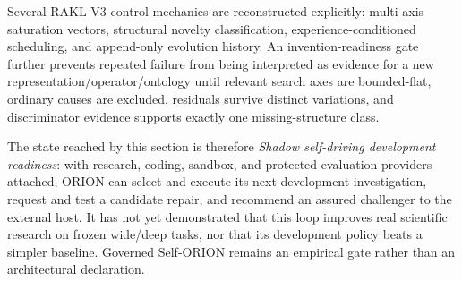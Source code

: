Several RAKL V3 control mechanics are reconstructed explicitly: multi-axis saturation vectors, structural novelty classification, experience-conditioned scheduling, and append-only evolution history.  An invention-readiness gate further prevents repeated failure from being interpreted as evidence for a new representation/operator/ontology until relevant search axes are bounded-flat, ordinary causes are excluded, residuals survive distinct variations, and discriminator evidence supports exactly one missing-structure class.

The state reached by this section is therefore \emph{Shadow self-driving development readiness}: with research, coding, sandbox, and protected-evaluation providers attached, ORION can select and execute its next development investigation, request and test a candidate repair, and recommend an assured challenger to the external host.  It has not yet demonstrated that this loop improves real scientific research on frozen wide/deep tasks, nor that its development policy beats a simpler baseline.  Governed Self-ORION remains an empirical gate rather than an architectural declaration.
